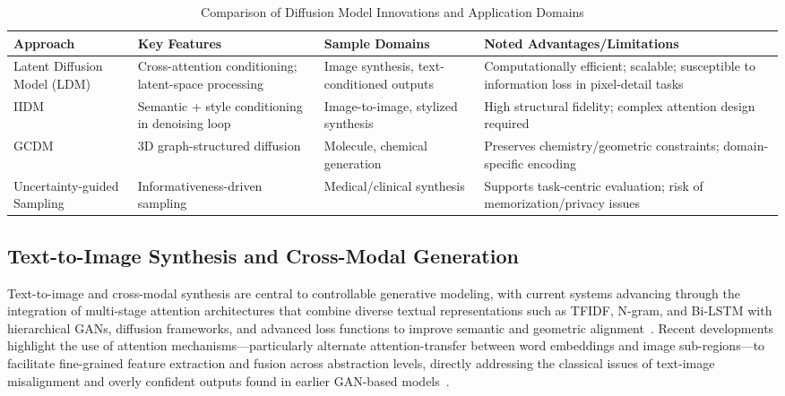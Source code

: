 \documentclass[sigconf]{acmart}
\begin{document}
\begin{table*}[htbp]
\centering
\caption{Comparison of Diffusion Model Innovations and Application Domains}
\label{tab:diffusion_summary}
\begin{adjustbox}{max width=\textwidth}
\begin{tabular}{llll}
\toprule
\textbf{Approach} & \textbf{Key Features} & \textbf{Sample Domains} & \textbf{Noted Advantages/Limitations} \\
\midrule
Latent Diffusion Model (LDM) & Cross-attention conditioning; latent-space processing & Image synthesis, text-conditioned outputs & Computationally efficient; scalable; susceptible to information loss in pixel-detail tasks \\
IIDM & Semantic + style conditioning in denoising loop & Image-to-image, stylized synthesis & High structural fidelity; complex attention design required \\
GCDM & 3D graph-structured diffusion & Molecule, chemical generation & Preserves chemistry/geometric constraints; domain-specific encoding \\
Uncertainty-guided Sampling & Informativeness-driven sampling & Medical/clinical synthesis & Supports task-centric evaluation; risk of memorization/privacy issues \\
\bottomrule
\end{tabular}
\end{adjustbox}
\end{table*}

\subsection{Text-to-Image Synthesis and Cross-Modal Generation}

Text-to-image and cross-modal synthesis are central to controllable generative modeling, with current systems advancing through the integration of multi-stage attention architectures that combine diverse textual representations such as TFIDF, N-gram, and Bi-LSTM with hierarchical GANs, diffusion frameworks, and advanced loss functions to improve semantic and geometric alignment~\cite{ref94,ref96}. Recent developments highlight the use of attention mechanisms—particularly alternate attention-transfer between word embeddings and image sub-regions—to facilitate fine-grained feature extraction and fusion across abstraction levels, directly addressing the classical issues of text-image misalignment and overly confident outputs found in earlier GAN-based models~\cite{ref94,ref96}.
\end{document}
